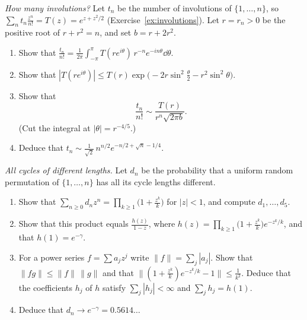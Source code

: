 \begin{exercise}[$\star\star\star$]\label{pb:involasym}
\emph{How many involutions?} Let $t_n$ be the number of involutions of $\{1,\dots,n\}$, so $\sum_nt_n\frac{z^n}{n!}=T(z)=e^{z+z^2/2}$ (Exercise~\ref{ex:involutions}). Let $r=r_n>0$ be the positive root of $r+r^2=n$, and set $b=r+2r^2$.
\begin{enumerate}[label=(\alph*)]
\item Show that $\frac{t_n}{n!}=\frac1{2\pi}\int_{-\pi}^\pi T(re^{i\theta})\,r^{-n}e^{-in\theta}\dd\theta$.
\item Show that $|T(re^{i\theta})|\le T(r)\exp\bigl(-2r\sin^2\frac\theta2-r^2\sin^2\theta\bigr)$.
\item Show that
\[
\frac{t_n}{n!}\sim\frac{T(r)}{r^n\sqrt{2\pi b}}.
\]
(Cut the integral at $|\theta|=r^{-4/5}$.)
\item Deduce that $t_n\sim\frac1{\sqrt2}\,n^{n/2}e^{-n/2+\sqrt n-1/4}$.
\end{enumerate}
\end{exercise}

\begin{exercise}[$\star\star\star$]\label{pb:distinctcycles}
\emph{All cycles of different lengths.} Let $d_n$ be the probability that a uniform random permutation of $\{1,\dots,n\}$ has all its cycle lengths different.
\begin{enumerate}[label=(\alph*)]
\item Show that $\sum_{n\ge0}d_nz^n=\prod_{k\ge1}\bigl(1+\frac{z^k}k\bigr)$ for $|z|<1$, and compute $d_1,\dots,d_5$.
\item Show that this product equals $\frac{h(z)}{1-z}$, where $h(z)=\prod_{k\ge1}\bigl(1+\frac{z^k}k\bigr)e^{-z^k/k}$, and that $h(1)=e^{-\gamma}$.
\item For a power series $f=\sum a_jz^j$ write $\|f\|=\sum_j|a_j|$. Show that $\|fg\|\le\|f\|\,\|g\|$ and that $\bigl\|(1+\frac{z^k}k)e^{-z^k/k}-1\bigr\|\le\frac1{k^2}$.
Deduce that the coefficients $h_j$ of $h$ satisfy $\sum_j|h_j|<\infty$ and $\sum_jh_j=h(1)$.
\item Deduce that $d_n\to e^{-\gamma}=0.5614\ldots$
\end{enumerate}
\end{exercise}

